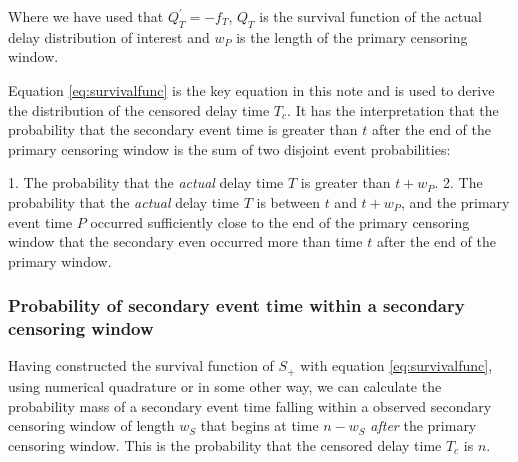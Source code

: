 \documentclass[10pt,letterpaper]{article}
\begin{document}
Where we have used that $Q^{'}_{T} = - f_T$, $Q_T$ is the survival function of the actual delay distribution of interest and $w_P$ is the length of the primary censoring window.

Equation \ref{eq:survivalfunc} is the key equation in this note and is used to derive the distribution of the censored delay time $T_c$. It has the interpretation that the probability that the secondary event time is greater than $t$ after the end of the primary censoring window is the sum of two disjoint event probabilities:

1. The probability that the \textit{actual} delay time $T$ is greater than $t + w_P$.
2. The probability that the \textit{actual} delay time $T$ is between $t$ and $t + w_P$, and the primary event time $P$ occurred sufficiently close to the end of the primary censoring window that the secondary even occurred more than time $t$ after the end of the primary window.




\subsubsection{Probability of secondary event time within a secondary censoring window}

Having constructed the survival function of $S_+$ with equation \ref{eq:survivalfunc}, using numerical quadrature or in some other way, we can calculate the probability mass of a secondary event time falling within a observed secondary censoring window of length $w_S$ that begins at time $n - w_S$ \textit{after} the primary censoring window. This is the probability that the censored delay time $T_c$ is $n$.
\end{document}
